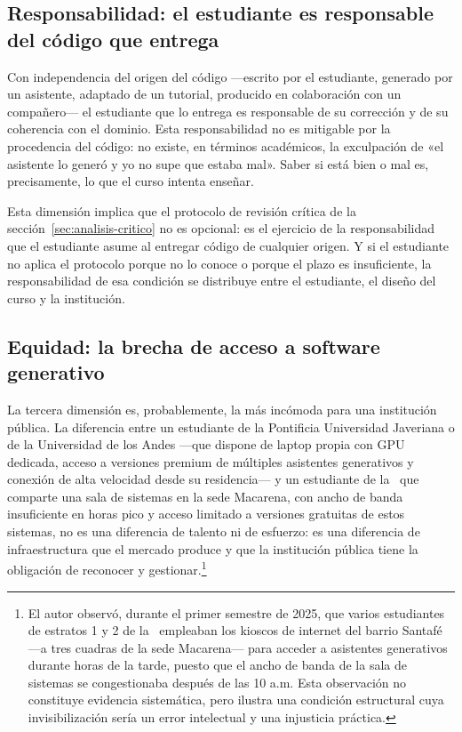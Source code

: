 \subsection{Responsabilidad: el estudiante es responsable del código que entrega}
\label{subsec:responsabilidad}

Con independencia del origen del código ---escrito por el estudiante, generado
por un asistente, adaptado de un tutorial, producido en colaboración con un
compañero--- el estudiante que lo entrega es responsable de su corrección y de
su coherencia con el dominio. Esta responsabilidad no es mitigable por la
procedencia del código: no existe, en términos académicos, la exculpación de
«el asistente lo generó y yo no supe que estaba mal». Saber si está bien o mal
es, precisamente, lo que el curso intenta enseñar.

Esta dimensión implica que el protocolo de revisión crítica de la
sección~\ref{sec:analisis-critico} no es opcional: es el ejercicio de la
responsabilidad que el estudiante asume al entregar código de cualquier origen.
Y si el estudiante no aplica el protocolo porque no lo conoce o porque el plazo
es insuficiente, la responsabilidad de esa condición se distribuye entre el
estudiante, el diseño del curso y la institución.

\subsection{Equidad: la brecha de acceso a software generativo}
\label{subsec:equidad}

La tercera dimensión es, probablemente, la más incómoda para una institución
pública. La diferencia entre un estudiante de la Pontificia Universidad Javeriana
o de la Universidad de los Andes ---que dispone de laptop propia con GPU dedicada,
acceso a versiones premium de múltiples asistentes generativos y conexión de
alta velocidad desde su residencia--- y un estudiante de la \ud\ que comparte
una sala de sistemas en la sede Macarena, con ancho de banda insuficiente en
horas pico y acceso limitado a versiones gratuitas de estos sistemas, no es
una diferencia de talento ni de esfuerzo: es una diferencia de infraestructura
que el mercado produce y que la institución pública tiene la obligación de
reconocer y gestionar.\footnote{El autor observó, durante el primer semestre
de 2025, que varios estudiantes de estratos 1 y 2 de la \ud\ empleaban los
kioscos de internet del barrio Santafé ---a tres cuadras de la sede Macarena---
para acceder a asistentes generativos durante horas de la tarde, puesto que el
ancho de banda de la sala de sistemas se congestionaba después de las 10 a.m.
Esta observación no constituye evidencia sistemática, pero ilustra una condición
estructural cuya invisibilización sería un error intelectual y una injusticia
práctica.}

